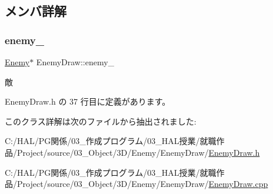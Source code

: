 \subsection{メンバ詳解}
\mbox{\label{class_enemy_draw_a95b8a7f07e810d1347f1704669c8f790}} 
\subsubsection{\texorpdfstring{enemy\+\_\+}{enemy\_}}
{\footnotesize\ttfamily \mbox{\hyperlink{class_enemy}{Enemy}}$\ast$ Enemy\+Draw\+::enemy\+\_\+\hspace{0.3cm}{\ttfamily [private]}}



敵 



 Enemy\+Draw.\+h の 37 行目に定義があります。



このクラス詳解は次のファイルから抽出されました\+:\begin{DoxyCompactItemize}
\item 
C\+:/\+H\+A\+L/\+P\+G関係/03\+\_\+作成プログラム/03\+\_\+\+H\+A\+L授業/就職作品/\+Project/source/03\+\_\+\+Object/3\+D/\+Enemy/\+Enemy\+Draw/\mbox{\hyperlink{_enemy_draw_8h}{Enemy\+Draw.\+h}}\item 
C\+:/\+H\+A\+L/\+P\+G関係/03\+\_\+作成プログラム/03\+\_\+\+H\+A\+L授業/就職作品/\+Project/source/03\+\_\+\+Object/3\+D/\+Enemy/\+Enemy\+Draw/\mbox{\hyperlink{_enemy_draw_8cpp}{Enemy\+Draw.\+cpp}}\end{DoxyCompactItemize}
